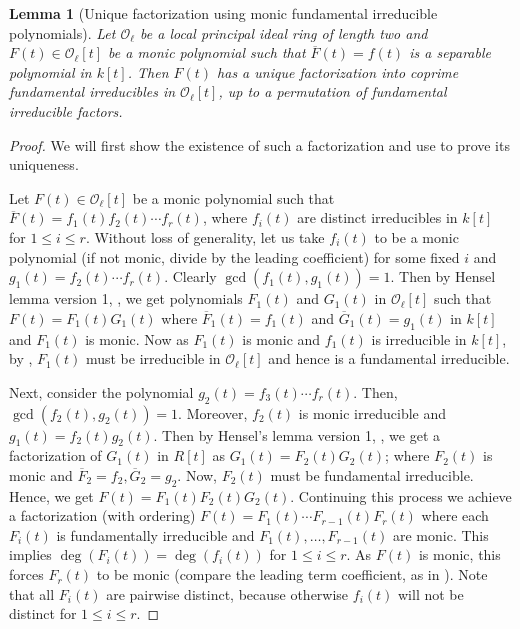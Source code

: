 \documentclass[11pt,twoside]{amsart}
\newtheorem{lemma}{Lemma}[section]
\theoremstyle{definition} %
\begin{document}
\begin{lemma}[Unique factorization using  monic fundamental irreducible polynomials]\label{lem:tech-1-thm-1}
Let $\mathscr O_{\ell}$ be a local principal ideal ring of length two and $F(t) \in\mathscr O_\ell[t]$ be a monic polynomial such that $\overline{F}(t) = f(t)$ is a separable polynomial in $k[t]$. Then $F(t)$ has a unique factorization into coprime fundamental irreducibles in $\mathscr O_\ell[t]$, up to a permutation of fundamental irreducible factors.
\end{lemma}
\begin{proof}
We will first show the existence of such a factorization and use  to prove its uniqueness.

Let $F(t)\in \mathscr O_\ell[t]$ be a monic polynomial such that $\overline{F}(t) = f_1(t)f_2(t)\cdots f_r(t)$, where $f_i(t)$ are distinct irreducibles in $k[t]$ for $1\leq i\leq r$.
Without loss of generality, let us take $f_i(t)$ to be a monic polynomial (if not monic, divide by the leading coefficient) for some fixed $i$ and $g_1(t) = f_2(t)\cdots f_r(t)$.
Clearly $\gcd(f_1(t), g_1(t)) = 1$. 
Then by Hensel lemma version 1, , we get polynomials $F_1(t)$ and $G_1(t)$ in $\mathscr O_\ell[t]$ such that $F(t) = F_1(t)G_1(t)$ where $\overline{F}_1(t) =f_1(t)$ and $\overline{G}_1(t) =g_1(t)$ in $k[t]$ and $F_1(t)$ is monic.
Now as $F_1(t)$ is monic and $f_1(t)$ is irreducible in $k[t]$, by , $F_1(t)$ must be irreducible in $\mathscr O_\ell[t]$ and hence is a fundamental irreducible.

Next, consider the polynomial ${g}_2(t) = f_3(t)\cdots f_r(t).$ 
Then, $\gcd(f_2(t), {g}_2(t))=1$. Moreover, $f_2(t)$ is monic irreducible and $g_1(t) = f_2(t){g}_2(t)$. Then by Hensel's lemma version 1, , we get a factorization of $G_1(t)$ in $R[t]$ as $G_1(t) = F_2(t)G_2(t)$; where $F_2(t)$ is monic and $\overline{F}_2 =f_2, \overline{G}_2={g_2}$. 
Now, $F_2(t)$ must be fundamental irreducible. Hence, we get $F(t)=F_1(t) F_2(t) G_2(t)$. Continuing this process we achieve a factorization (with ordering) $F(t) =F_1(t)\cdots F_{r-1}(t)F_r(t)$ where each $F_i(t)$ is fundamentally irreducible and $F_1(t),\ldots, F_{r-1}(t)$ are monic. This implies $\deg(F_i(t)) = \deg(f_i(t))$ for $1\leq i\leq r$. As $F(t)$ is monic, this forces $F_r(t)$ to be monic (compare the leading term coefficient, as in ). Note that all $F_i(t)$ are pairwise distinct, because otherwise $f_i(t)$ will not be distinct for $1\leq i\leq r$.


\end{proof}
\end{document}
